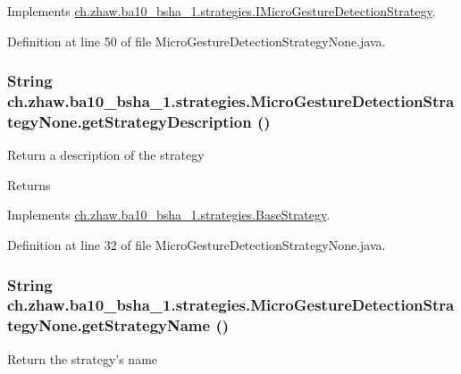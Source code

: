 Implements \hyperlink{interfacech_1_1zhaw_1_1ba10__bsha__1_1_1strategies_1_1IMicroGestureDetectionStrategy_a8593331fb67e5d4dc890d3db9f2d1b58}{ch.zhaw.ba10\_\-bsha\_\-1.strategies.IMicroGestureDetectionStrategy}.

Definition at line 50 of file MicroGestureDetectionStrategyNone.java.\hypertarget{classch_1_1zhaw_1_1ba10__bsha__1_1_1strategies_1_1MicroGestureDetectionStrategyNone_ad6f173fc0670d819bfa82551fc9775f5}{
\subsubsection[{getStrategyDescription}]{\setlength{\rightskip}{0pt plus 5cm}String ch.zhaw.ba10\_\-bsha\_\-1.strategies.MicroGestureDetectionStrategyNone.getStrategyDescription ()}}
\label{classch_1_1zhaw_1_1ba10__bsha__1_1_1strategies_1_1MicroGestureDetectionStrategyNone_ad6f173fc0670d819bfa82551fc9775f5}
Return a description of the strategy

\begin{DoxyReturn}{Returns}

\end{DoxyReturn}


Implements \hyperlink{classch_1_1zhaw_1_1ba10__bsha__1_1_1strategies_1_1BaseStrategy_a75fdb36932ad701f6375cc1fe718056b}{ch.zhaw.ba10\_\-bsha\_\-1.strategies.BaseStrategy}.

Definition at line 32 of file MicroGestureDetectionStrategyNone.java.\hypertarget{classch_1_1zhaw_1_1ba10__bsha__1_1_1strategies_1_1MicroGestureDetectionStrategyNone_a2e46564a49ac92530fc648e3149d5ee4}{
\subsubsection[{getStrategyName}]{\setlength{\rightskip}{0pt plus 5cm}String ch.zhaw.ba10\_\-bsha\_\-1.strategies.MicroGestureDetectionStrategyNone.getStrategyName ()}}
\label{classch_1_1zhaw_1_1ba10__bsha__1_1_1strategies_1_1MicroGestureDetectionStrategyNone_a2e46564a49ac92530fc648e3149d5ee4}
Return the strategy's name

